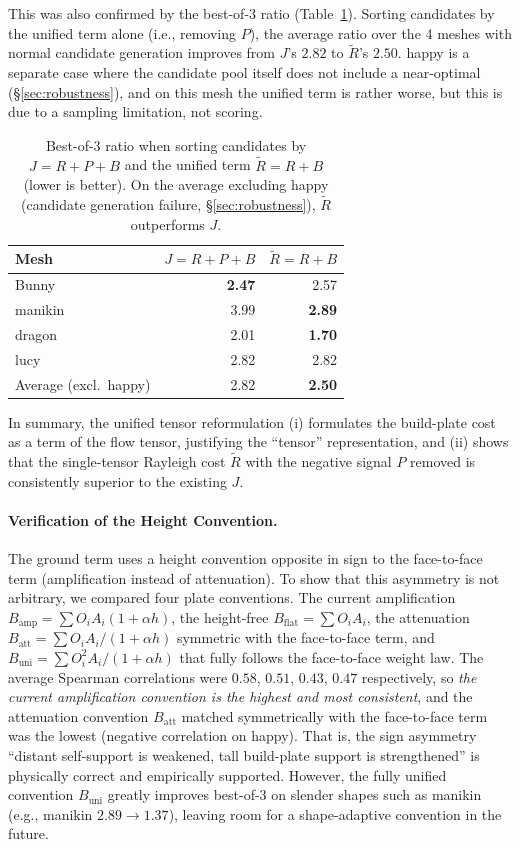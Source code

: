 \documentclass[11pt,a4paper]{article}
\begin{document}
This was also confirmed by the best-of-3 ratio (Table~\ref{tab:unified-b3}).
Sorting candidates by the unified term alone (i.e., removing $P$),
the average ratio over the 4 meshes with normal candidate generation improves from $J$'s $2.82$ to $\tilde R$'s $2.50$.
happy is a separate case where the candidate pool itself does not include a near-optimal (\S\ref{sec:robustness}),
and on this mesh the unified term is rather worse, but this is due to a sampling limitation, not scoring.

\begin{table}[H]
\centering
\caption{Best-of-3 ratio when sorting candidates by $J=R+P+B$ and the unified term $\tilde R=R+B$ (lower is better).
On the average excluding happy (candidate generation failure, \S\ref{sec:robustness}), $\tilde R$ outperforms $J$.}
\label{tab:unified-b3}
\begin{tabular}{lrr}
\toprule
Mesh & $J=R{+}P{+}B$ & $\tilde R=R{+}B$\\
\midrule
Bunny   & \textbf{2.47} & 2.57\\
manikin & 3.99 & \textbf{2.89}\\
dragon  & 2.01 & \textbf{1.70}\\
lucy    & 2.82 & 2.82\\
\midrule
Average (excl.\ happy) & 2.82 & \textbf{2.50}\\
\bottomrule
\end{tabular}
\end{table}

In summary, the unified tensor reformulation (i) formulates the build-plate cost as a term of the flow tensor,
justifying the ``tensor'' representation, and (ii) shows that the single-tensor Rayleigh cost $\tilde R$ with the negative signal $P$ removed
is consistently superior to the existing $J$.

\paragraph{Verification of the Height Convention.}
The ground term uses a height convention opposite in sign to the face-to-face term (amplification instead of attenuation).
To show that this asymmetry is not arbitrary, we compared four plate conventions.
The current amplification $B_{\mathrm{amp}}=\sum O_iA_i(1+\alpha h)$,
the height-free $B_{\mathrm{flat}}=\sum O_iA_i$,
the attenuation $B_{\mathrm{att}}=\sum O_iA_i/(1+\alpha h)$ symmetric with the face-to-face term,
and $B_{\mathrm{uni}}=\sum O_i^2A_i/(1+\alpha h)$ that fully follows the face-to-face weight law.
The average Spearman correlations were $0.58$, $0.51$, $0.43$, $0.47$ respectively,
so \emph{the current amplification convention is the highest and most consistent},
and the attenuation convention $B_{\mathrm{att}}$ matched symmetrically with the face-to-face term was the lowest (negative correlation on happy).
That is, the sign asymmetry ``distant self-support is weakened, tall build-plate support is strengthened''
is physically correct and empirically supported.
However, the fully unified convention $B_{\mathrm{uni}}$ greatly improves best-of-3 on slender shapes such as manikin
(e.g., manikin $2.89\to1.37$), leaving room for a shape-adaptive convention in the future.
\end{document}

